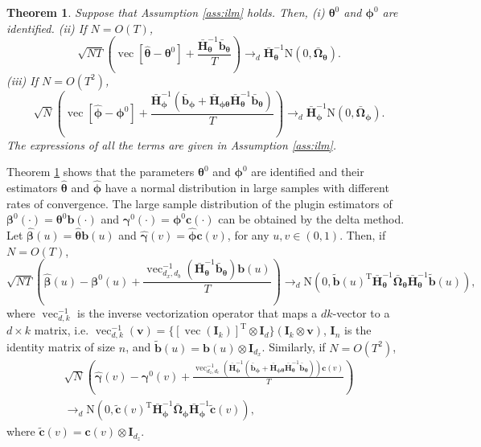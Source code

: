 \documentclass[12pt]{article}
\def\T{{ \mathrm{\scriptscriptstyle T} }}
\def\thetavec{\bm{\theta}}
\def\phivec{\bm{\phi}}
\def\betavec{\bm{\beta}}
\def\gammavec{\bm{\gamma}}
\def\aa{\bm{\alpha}_N}
\def\aahat{\hat{\bm{\alpha}}_N}
\def\bvec{\bm{b}}
\def\cvec{\bm{c}}
\def\vvec{\bm{v}}
\def\I{\bm{I}}
\def\H{\bm{H}}
\def\O{\bm{\Omega}}
\def\zerovec{\bm{0}}
\def\csi{\bm{\xi}}
\DeclareMathOperator{\ve}{vec}
\newtheorem{theorem}{Theorem}
\begin{document}
\vspace{0.4cm}



\begin{theorem}\label{thm:ilm} Suppose that Assumption \ref{ass:ilm} holds. Then, (i) $\thetavec^0$ and $\phivec^0$ are identified. (ii) If $N = O(T)$,
$$
\sqrt{NT}\left( \ve\left[\hat{\thetavec} - \thetavec^0\right] + \frac{\bar{\H}_{\thetavec}^{-1} \bar{\bvec}_{\thetavec}}{T} \right) \to_d \bar{\H}_{\thetavec}^{-1} \text{N}(0, \bar{\O}_{\thetavec}). 
$$ 
(iii) If $N = O(T^2)$,
$$
\sqrt{N}\left( \ve\left[\hat{\phivec} - \phivec^0\right] + \frac{\bar{\H}_{\phivec}^{-1} (\bar{\bvec}_{\phivec} +  \bar{\H}_{\phivec\thetavec} \bar{\H}_{\thetavec}^{-1}\bar{\bvec}_{\thetavec})}{T} \right) \to_d \bar{\H}_{\phivec}^{-1} \text{N}(0, \bar{\O}_{\phivec}). 
$$ 
The expressions of all the terms are given in Assumption \ref{ass:ilm}.
\end{theorem}

\vspace{0.4cm}

Theorem \ref{thm:ilm} shows that the parameters $\thetavec^0$ and $\phivec^0$ are identified and  their estimators $\hat{\thetavec}$ and $\hat{\phivec}$ have a normal distribution in large samples with different rates of convergence. The large sample distribution of the plugin estimators of $\betavec^0(\cdot) = \thetavec^0\bvec(\cdot)$ and $\gammavec^0(\cdot) = \phivec^0 \cvec(\cdot)$ can be obtained by the delta method. Let $\hat{\betavec}(u) = \hat{\thetavec} \bvec(u)$ and $\hat{\gammavec}(v) = \hat{\phivec} \cvec(v)$, for any $u,v \in (0,1)$. Then, if $N = O(T)$,
$$
\sqrt{NT}\left( \hat{\betavec}(u) - \betavec^0(u) + \frac{\ve_{d_x,d_{b}}^{-1}(\bar{\H}_{\thetavec}^{-1} \bar{\bvec}_{\thetavec}) \bvec(u)}{T} \right) \to_d  \text{N}(0, \tilde{\bvec}(u)^{\T}\bar{\H}_{\thetavec}^{-1}\bar{\O}_{\thetavec}\bar{\H}_{\thetavec}^{-1} \tilde{\bvec}(u)),
$$
where $\ve_{d,k}^{-1}$ is the inverse vectorization operator that maps a $dk$-vector to a $d \times k$ matrix, i.e. $\ve_{d,k}^{-1}(\vvec) = \{[\ve(\I_k)]^{\T} \otimes \I_d \} (\I_k \otimes \vvec)$, $\I_n$ is the identity matrix of size $n$, and $\tilde{\bvec}(u) = \bvec(u) \otimes \I_{d_x}$. Similarly, if $N = O(T^2)$,
\begin{multline*}
\sqrt{N}\left( \hat{\gammavec}(v) - \gammavec^0(v) + \frac{\ve_{d_z,d_{c}}^{-1}(\bar{\H}_{\phivec}^{-1} (\bar{\bvec}_{\phivec} +  \bar{\H}_{\phivec\thetavec} \bar{\H}_{\thetavec}^{-1}\bar{\bvec}_{\thetavec})) \cvec(v)}{T} \right) \\ \to_d  \text{N}(0, \tilde{\cvec}(v)^{\T}\bar{\H}_{\phivec}^{-1}\bar{\O}_{\phivec}\bar{\H}_{\phivec}^{-1} \tilde{\cvec}(v)),
\end{multline*}
where $\tilde{\cvec}(v) = \cvec(v) \otimes \I_{d_z}$. 
\end{document}
